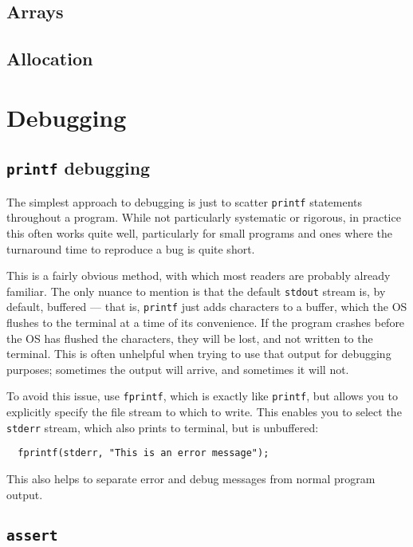\documentclass[a4paper,10pt]{article}
\newcommand{\kw}[1]{\texttt{#1}}
\begin{document}
\subsection{Arrays}

\subsection{Allocation}

\section{Debugging}

\subsection{\kw{printf} debugging}

The simplest approach to debugging is just to scatter \kw{printf}
statements throughout a program. While not particularly systematic or
rigorous, in practice this often works quite well, particularly for
small programs and ones where the turnaround time to reproduce a bug
is quite short.

This is a fairly obvious method, with which most readers are probably
already familiar. The only nuance to mention is that the default
\kw{stdout} stream is, by default, buffered --- that is, \kw{printf}
just adds characters to a buffer, which the OS flushes to the terminal
at a time of its convenience. If the program crashes before the OS has
flushed the characters, they will be lost, and not written to the
terminal. This is often unhelpful when trying to use that output for
debugging purposes; sometimes the output will arrive, and sometimes it
will not.

To avoid this issue, use \kw{fprintf}, which is exactly like
\kw{printf}, but allows you to explicitly specify the file stream to
which to write. This enables you to select the \kw{stderr} stream,
which also prints to terminal, but is unbuffered:

\begin{lstlisting}
  fprintf(stderr, "This is an error message");
\end{lstlisting}

This also helps to separate error and debug messages from normal
program output.

\subsection{\kw{assert}}
\end{document}
